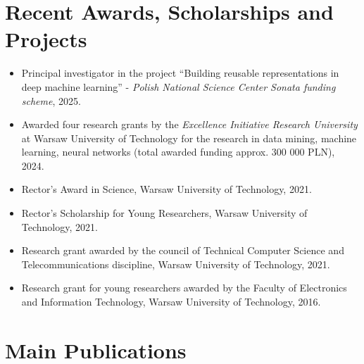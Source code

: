 \documentclass[10pt,a4paper,sans]{moderncv}        %
\begin{document}
\section{Recent Awards, Scholarships and Projects}
 \begin{itemize}
 \item Principal investigator in the project ``Building reusable representations in deep machine learning'' - \textit{Polish National Science Center Sonata funding scheme}, 2025.
 \item Awarded four research grants by the \textit{Excellence Initiative Research University} at Warsaw University of Technology  for the research in data mining, machine learning, neural networks (total awarded funding approx. 300 000 PLN), 2024.
 \item Rector's Award in Science, Warsaw University of Technology, 2021.
 \item Rector's Scholarship for Young Researchers, Warsaw University of Technology, 2021.
\item Research grant awarded by the council of Technical Computer Science and Telecommunications discipline, Warsaw University of Technology, 2021.
 \item Research grant for young researchers awarded by the Faculty of Electronics and Information Technology, Warsaw University of Technology, 2016.
 \end{itemize}

 \section{Main Publications}

\end{document}
